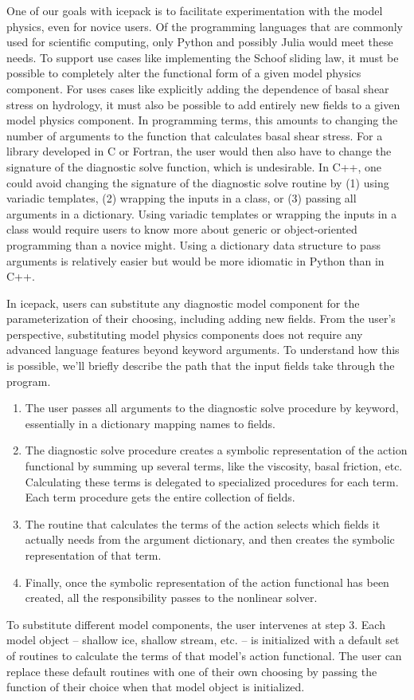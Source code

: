 \documentclass{article}
\theoremstyle{definition}
\theoremstyle{plain}
\begin{document}
One of our goals with icepack is to facilitate experimentation with the model physics, even for novice users.
Of the programming languages that are commonly used for scientific computing, only Python and possibly Julia would meet these needs.
To support use cases like implementing the Schoof sliding law, it must be possible to completely alter the functional form of a given model physics component.
For uses cases like explicitly adding the dependence of basal shear stress on hydrology, it must also be possible to add entirely new fields to a given model physics component.
In programming terms, this amounts to changing the number of arguments to the function that calculates basal shear stress.
For a library developed in C or Fortran, the user would then also have to change the signature of the diagnostic solve function, which is undesirable.
In C++, one could avoid changing the signature of the diagnostic solve routine by (1) using variadic templates, (2) wrapping the inputs in a class, or (3) passing all arguments in a dictionary.
Using variadic templates or wrapping the inputs in a class would require users to know more about generic or object-oriented programming than a novice might.
Using a dictionary data structure to pass arguments is relatively easier but would be more idiomatic in Python than in C++.

In icepack, users can substitute any diagnostic model component for the parameterization of their choosing, including adding new fields.
From the user's perspective, substituting model physics components does not require any advanced language features beyond keyword arguments.
To understand how this is possible, we'll briefly describe the path that the input fields take through the program.
\begin{enumerate}
    \item The user passes all arguments to the diagnostic solve procedure by keyword, essentially in a dictionary mapping names to fields.
    \item The diagnostic solve procedure creates a symbolic representation of the action functional by summing up several terms, like the viscosity, basal friction, etc.
        Calculating these terms is delegated to specialized procedures for each term.
        Each term procedure gets the entire collection of fields.
    \item The routine that calculates the terms of the action selects which fields it actually needs from the argument dictionary, and then creates the symbolic representation of that term.
    \item Finally, once the symbolic representation of the action functional has been created, all the responsibility passes to the nonlinear solver.
\end{enumerate}
To substitute different model components, the user intervenes at step 3.
Each model object -- shallow ice, shallow stream, etc. -- is initialized with a default set of routines to calculate the terms of that model's action functional.
The user can replace these default routines with one of their own choosing by passing the function of their choice when that model object is initialized.
\end{document}
